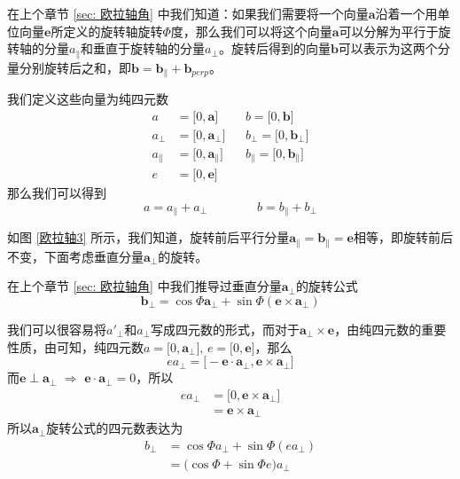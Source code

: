在上个章节 \ref{sec: 欧拉轴角} 中我们知道：如果我们需要将一个向量$\bm{a}$沿着一个用单位向量$\bm{e}$所定义的旋转轴旋转$\varPhi$度，那么我们可以将这个向量$\bm{a}$可以分解为平行于旋转轴的分量$a_{\parallel}$和垂直于旋转轴的分量$a_{\perp}$。旋转后得到的向量$\bm{b}$可以表示为这两个分量分别旋转后之和，即$\bm{b} = \bm{b}_{\parallel} + \bm{b}_{perp}$。

我们定义这些向量为纯四元数
\begin{align*}
	a &= \big[ 0, \bm{a} \big]  && b = \big[ 0, \bm{b} \big] \\
	a_\perp &= \big[ 0, \bm{a}_\perp \big] && b_\perp = \big[ 0, \bm{b}_\perp \big] \\
	a_\parallel &= \big[ 0, \bm{a}_\parallel \big] && b_\parallel = \big[ 0, \bm{b}_\parallel \big] \\
	e &= \big[0, \bm{e} \big] 
\end{align*}
那么我们可以得到
\begin{equation*}
	a = a_\parallel + a_\perp \qquad \qquad b = b_\parallel + b_\perp
\end{equation*}

如图 \ref{欧拉轴3} 所示，我们知道，旋转前后平行分量$\bm{a}_{\parallel} = \bm{b}_{\parallel} = \bm{e}$相等，即旋转前后不变，下面考虑垂直分量$\bm{a}_{\perp}$的旋转。

在上个章节 \ref{sec: 欧拉轴角} 中我们推导过垂直分量$\bm{a}_{\perp}$的旋转公式
\begin{equation*}
	\bm{b}_{\perp} = \cos \varPhi \bm{a}_\perp + \sin \varPhi (\bm{e} \times \bm{a}_\perp )
\end{equation*}

我们可以很容易将$a'_\perp$和$a_\perp$写成四元数的形式，而对于$\bm{a}_\perp \times \bm{e}$，由纯四元数的重要性质，由可知，纯四元数$a = \big[ 0, \bm{a_\perp}\big], \, e = \big[ 0, \bm{e} \big]$，那么
\begin{equation*}
	ea_\perp = \big[ - \bm{e} \cdot \bm{a}_\perp, \bm{e} \times \bm{a}_\perp \big]
\end{equation*}
而$\bm{e} \perp \bm{a}_\perp \,\, \Rightarrow \,\, \bm{e} \cdot \bm{a}_\perp = 0$，所以
\begin{align*}
	ea_\perp & = \big[ 0, \bm{e} \times \bm{a}_\perp \big] \\
	& = \bm{e} \times \bm{a}_\perp
\end{align*}
所以$\bm{a}_{\perp}$旋转公式的四元数表达为
\begin{align}
	b_\perp &= \cos \varPhi a_\perp + \sin \varPhi (ea_\perp)\\
	& = \big( \cos \varPhi + \sin \varPhi e \big) a_\perp 
\end{align}

